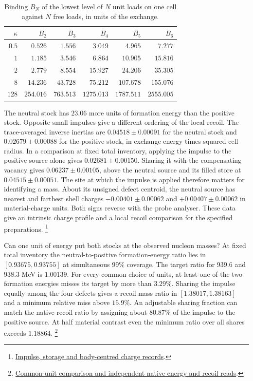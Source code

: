 \documentclass[11pt]{article}
\theoremstyle{definition}
\theoremstyle{remark}
\theoremstyle{plain}
\begin{document}
\begin{table}[!htb]
\centering
\caption{Binding $B_N$ of the lowest level of $N$ unit loads on one cell
against $N$ free loads, in units of the exchange.}
\label{tab:bindings}
\begin{tabular}{@{}rrrrrr@{}}
\toprule
$\kappa$ & $B_2$ & $B_3$ & $B_4$ & $B_5$ & $B_6$ \\
\midrule
$0.5$ & $0.526$ & $1.556$ & $3.049$ & $4.965$ & $7.277$ \\
$1$ & $1.185$ & $3.546$ & $6.864$ & $10.905$ & $15.816$ \\
$2$ & $2.779$ & $8.554$ & $15.927$ & $24.206$ & $35.305$ \\
$8$ & $14.236$ & $43.728$ & $75.212$ & $107.678$ & $155.076$ \\
$128$ & $254.016$ & $763.513$ & $1275.013$ & $1787.511$ & $2555.005$ \\
\bottomrule
\end{tabular}
\end{table}

The neutral stock has $23.06$ more units of formation energy than the
positive stock. Opposite small impulses give a different ordering of
the local recoil. The trace-averaged inverse inertias are
$0.04518\pm0.00091$ for the neutral stock and $0.02679\pm0.00088$ for
the positive stock, in exchange energy times squared cell radius.
In a comparison at fixed total inventory, applying the impulse to the
positive source alone gives $0.02681\pm0.00150$. Sharing it with the
compensating vacancy gives $0.06237\pm0.00105$, above the neutral
source and its filled store at $0.04515\pm0.00051$. The site at which
the impulse is applied therefore matters for identifying a mass.
About its unsigned defect centroid, the neutral source has nearest
and farthest shell charges $-0.00401\pm0.00062$ and
$+0.00407\pm0.00062$ in material-charge units. Both signs reverse
with the probe analyser. These data give an intrinsic charge profile
and a local recoil comparison for the specified preparations.%
\footnote{\href{https://github.com/FloatingPragma/observer-patch-holography/tree/main/model/candidate_laws/interval_echo/openwave/row_14_profile/recoil_radius}{Impulse, storage and body-centred charge records}.}

Can one unit of energy put both stocks at the observed nucleon masses?
At fixed total inventory the neutral-to-positive formation-energy ratio
lies in $[0.93675,0.93755]$ at simultaneous 99\% coverage. The target
ratio for $939.6$ and $938.3$ MeV is $1.00139$. For every common choice
of units, at least one of the two formation energies misses its target
by more than $3.29\%$. Sharing the impulse equally among the four
defects gives a recoil mass ratio in $[1.38017,1.38163]$ and a minimum
relative miss above $15.9\%$. An adjustable sharing fraction can match
the native recoil ratio by assigning about $80.87\%$ of the impulse to
the positive source. At half material contrast even the minimum ratio
over all shares exceeds $1.18864$.%
\footnote{\href{https://github.com/FloatingPragma/observer-patch-holography/tree/main/model/candidate_laws/interval_echo/openwave/row_15_common_unit}{Common-unit comparison and independent native energy and recoil reads}.}
\end{document}
